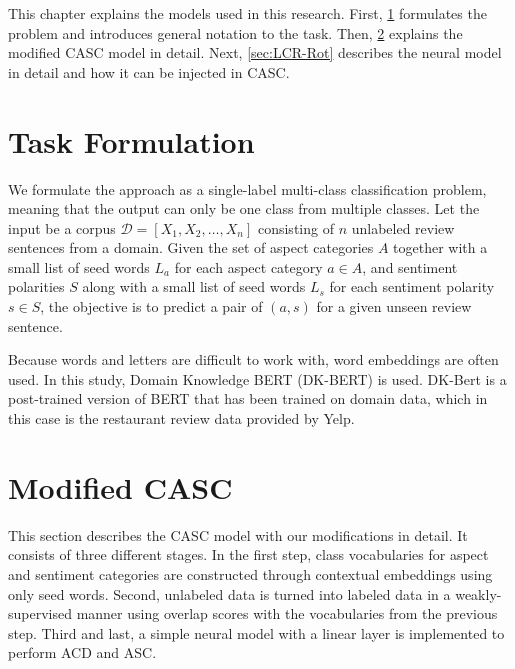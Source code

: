 \documentclass[american, oneside]{ecsgdp}
\begin{document}
This chapter explains the models used in this research. First, \cref{sec:formulation} formulates the problem and introduces general notation to the task. Then, \cref{sec:CASC} explains the modified CASC model in detail. Next, \cref{sec:LCR-Rot} describes the neural model in detail and how it can be injected in CASC.

\section{Task Formulation} \label{sec:formulation}
We formulate the approach as a single-label multi-class classification problem, meaning that the output can only be one class from multiple classes. Let the input be a corpus $\mathcal{D} = [X_1, X_2, \dots, X_n]$ consisting of $n$ unlabeled review sentences from a domain. Given the set of aspect categories $A$ together with a small list of seed words $L_a$ for each aspect category $a \in A$, and sentiment polarities $S$ along with a small list of seed words $L_s$ for each sentiment polarity $s \in S$, the objective is to predict a pair of $(a, s)$ for a given unseen review sentence.

Because words and letters are difficult to work with, word embeddings are often used. In this study, Domain Knowledge BERT (DK-BERT) \parencite{Xu2019DKBERT} is used. DK-Bert is a post-trained version of BERT \parencite{Devlin2019BERT} that has been trained on domain data, which in this case is the restaurant review data provided by Yelp.

\section{Modified CASC} \label{sec:CASC}
This section describes the CASC model with our modifications in detail. It consists of three different stages. In the first step, class vocabularies for aspect and sentiment categories are constructed through contextual embeddings using only seed words. Second, unlabeled data is turned into labeled data in a weakly-supervised manner using overlap scores with the vocabularies from the previous step. Third and last, a simple neural model with a linear layer is implemented to perform ACD and ASC.
\end{document}
